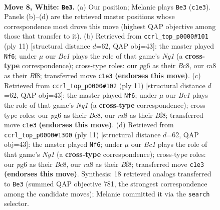 \documentclass[11pt]{article}
\begin{document}
\begin{figure}[p]\centering
\begin{subfigure}{0.46\textwidth}\centering
\resizebox{\linewidth}{!}{%
\newchessgame
\chessboard[
  setfen={rn1qkb1r/3ppp2/b4np1/2pP3p/4P3/2N5/PP3PPP/R1BQKBNR w KQkq - 0 8},
  showmover=false,
  pgfstyle=straightmove, color=movearrow, markmove={c1-e3}
]}
\caption{}
\end{subfigure}\hfill
\begin{subfigure}{0.46\textwidth}\centering
\resizebox{\linewidth}{!}{%
\newchessgame
\chessboard[
  setfen={r1bqkbnr/pp3ppp/2n5/2pp4/3P4/2N2NP1/PP2PP1P/R1BQKB1R b KQkq - 0 6},
  showmover=false,
  pgfstyle=straightmove, color=movearrow, markmove={g8-f6}
]}
\caption{}
\end{subfigure}
\\[4pt]
\begin{subfigure}{0.46\textwidth}\centering
\resizebox{\linewidth}{!}{%
\newchessgame
\chessboard[
  setfen={r1bqkbnr/pp3ppp/2n5/2pp4/3P4/2N2NP1/PP2PP1P/R1BQKB1R b KQkq - 0 6},
  showmover=false,
  pgfstyle=straightmove, color=movearrow, markmove={g8-f6}
]}
\caption{}
\end{subfigure}\hfill
\begin{subfigure}{0.46\textwidth}\centering
\resizebox{\linewidth}{!}{%
\newchessgame
\chessboard[
  setfen={r1bqkbnr/pp3ppp/2n5/2pp4/3P4/2N2NP1/PP2PP1P/R1BQKB1R b KQkq - 0 6},
  showmover=false,
  pgfstyle=straightmove, color=movearrow, markmove={g8-f6}
]}
\caption{}
\end{subfigure}
\caption{\textbf{Move 8, White: \texttt{Be3}.} (a) Our position; Melanie plays \texttt{Be3} (\texttt{c1e3}). Panels (b)--(d) are the retrieved master positions whose correspondence most drove this move (highest QAP objective among those that transfer to it). (b) Retrieved from \texttt{ccrl\_top\_p0000\#101} (ply 11) [structural distance $d$=62, QAP obj=43]: the master played \texttt{Nf6}; under $\mu$ our \emph{Bc1} plays the role of that game's \emph{Ng1} (a \textbf{cross-type} correspondence); cross-type roles: our \emph{p}g6 as their \emph{B}c8, our \emph{r}a8 as their \emph{B}f8; transferred move \texttt{c1e3} \textbf{(endorses this move)}. (c) Retrieved from \texttt{ccrl\_top\_p0000\#102} (ply 11) [structural distance $d$=62, QAP obj=43]: the master played \texttt{Nf6}; under $\mu$ our \emph{Bc1} plays the role of that game's \emph{Ng1} (a \textbf{cross-type} correspondence); cross-type roles: our \emph{p}g6 as their \emph{B}c8, our \emph{r}a8 as their \emph{B}f8; transferred move \texttt{c1e3} \textbf{(endorses this move)}. (d) Retrieved from \texttt{ccrl\_top\_p0000\#1300} (ply 11) [structural distance $d$=62, QAP obj=43]: the master played \texttt{Nf6}; under $\mu$ our \emph{Bc1} plays the role of that game's \emph{Ng1} (a \textbf{cross-type} correspondence); cross-type roles: our \emph{p}g6 as their \emph{B}c8, our \emph{r}a8 as their \emph{B}f8; transferred move \texttt{c1e3} \textbf{(endorses this move)}. Synthesis: 18 retrieved analogs transferred to \texttt{Be3} (summed QAP objective 781, the strongest correspondence among the candidate moves); Melanie committed it via the \texttt{search} selector.}
\label{fig:thought-m14}
\end{figure}
\end{document}
